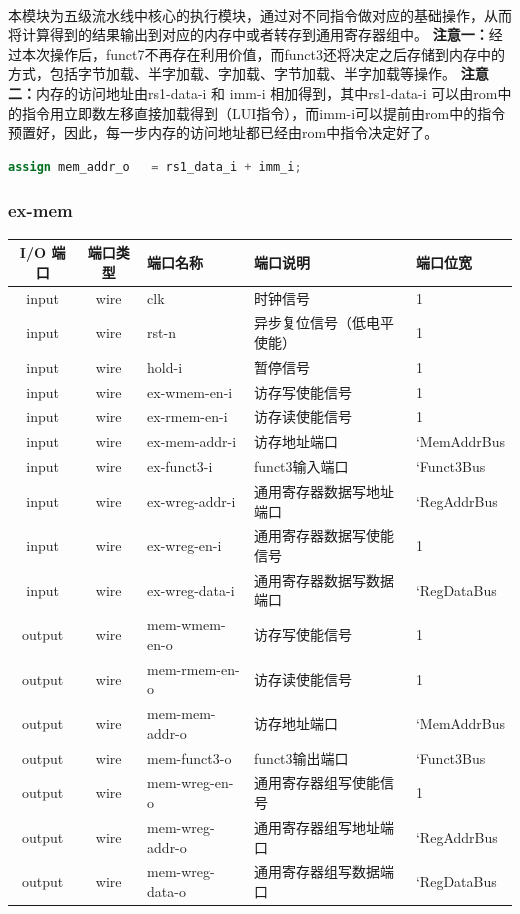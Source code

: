 \documentclass[lang=cn,11pt,a4paper]{elegantpaper}
\begin{document}
\\
本模块为五级流水线中核心的执行模块，通过对不同指令做对应的基础操作，从而将计算得到的结果输出到对应的内存中或者转存到通用寄存器组中。
\textbf{注意一：}经过本次操作后，funct7不再存在利用价值，而funct3还将决定之后存储到内存中的方式，包括字节加载、半字加载、字加载、字节加载、半字加载等操作。
\textbf{注意二：}内存的访问地址由rs1-data-i 和 imm-i 相加得到，其中rs1-data-i 可以由rom中的指令用立即数左移直接加载得到（LUI指令），而imm-i可以提前由rom中的指令预置好，因此，每一步内存的访问地址都已经由rom中指令决定好了。
\begin{lstlisting}[language=verilog]
assign mem_addr_o   = rs1_data_i + imm_i;
\end{lstlisting}
\subsubsection{ex-mem}
\begin{tabular}{cclll}
	\toprule
	I/O 端口 & 端口类型 &端口名称&端口说明 &端口位宽\\
	\midrule
	input &wire& clk & 时钟信号 & 1 \\
	input &wire& rst-n & 异步复位信号（低电平使能） & 1 \\
	input &wire& hold-i & 暂停信号       & 1   \\
	
	input &wire& ex-wmem-en-i & 访存写使能信号 & 1 \\
	input &wire& ex-rmem-en-i & 访存读使能信号 & 1 \\
	input &wire& ex-mem-addr-i &  访存地址端口   & `MemAddrBus   \\
	input &wire& ex-funct3-i & funct3输入端口    & `Funct3Bus   \\
	input &wire& ex-wreg-addr-i & 通用寄存器数据写地址端口 & `RegAddrBus \\
	input &wire& ex-wreg-en-i & 通用寄存器数据写使能信号 & 1  \\
	input &wire& ex-wreg-data-i & 通用寄存器数据写数据端口 & `RegDataBus  \\
	
	output &wire& mem-wmem-en-o & 访存写使能信号 & 1 \\
	output &wire& mem-rmem-en-o & 访存读使能信号 & 1 \\
	output &wire& mem-mem-addr-o &  访存地址端口   & `MemAddrBus   \\
	output &wire& mem-funct3-o & funct3输出端口    & `Funct3Bus   \\
	output &wire& mem-wreg-en-o & 通用寄存器组写使能信号    & 1   \\
	output &wire& mem-wreg-addr-o & 通用寄存器组写地址端口    & `RegAddrBus  \\
	output &wire& mem-wreg-data-o & 通用寄存器组写数据端口    & `RegDataBus  \\
	\bottomrule
\end{tabular}\\
\end{document}
